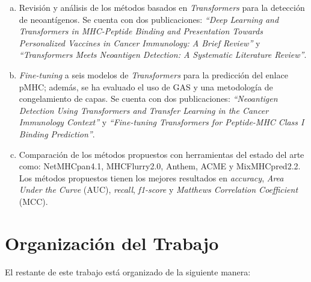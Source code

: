 \begin{enumerate}[(a)]
	\item Revisión y análisis de los métodos basados en \textit{Transformers} para la detección de neoantígenos. Se cuenta con dos publicaciones: \textit{``Deep Learning and Transformers in MHC-Peptide Binding and Presentation Towards Personalized Vaccines in Cancer Immunology: A Brief Review''} \citep{machaca2023deep} y \textit{``Transformers Meets Neoantigen Detection: A Systematic Literature Review''}.
	\item \textit{Fine-tuning} a seis modelos de \textit{Transformers} para la predicción del enlace pMHC; además, se ha evaluado el uso de GAS y una metodología de congelamiento de capas. Se cuenta con dos publicaciones: \textit{``Neoantigen Detection Using Transformers and Transfer Learning in the Cancer Immunology Context''} \citep{arceda2023neoantigen} y \textit{``Fine-tuning Transformers for Peptide-MHC Class I Binding Prediction''}.
	\item Comparación de los métodos propuestos con herramientas del estado del arte como: NetMHCpan4.1, MHCFlurry2.0, Anthem, ACME y MixMHCpred2.2. Los métodos propuestos tienen los mejores resultados en \textit{accuracy}, \textit{Area Under the Curve} (AUC), \textit{recall}, \textit{f1-score} y \textit{Matthews Correlation Coefficient}  (MCC).
\end{enumerate}

\clearpage
\section{Organización del Trabajo}
\label{sec:organizaciondeltrabajo}

El restante de este trabajo está organizado de la siguiente manera:

